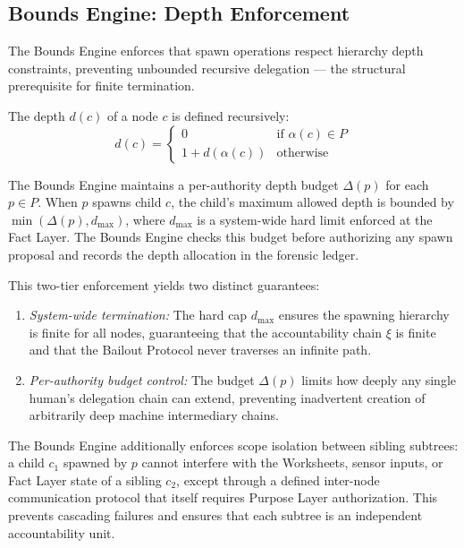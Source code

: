 \subsection{Bounds Engine: Depth Enforcement}
\label{sec:bounds-depth}

The Bounds Engine enforces that spawn operations respect hierarchy depth constraints, preventing unbounded recursive delegation — the structural prerequisite for finite termination.

The depth $d(c)$ of a node $c$ is defined recursively:
\begin{equation}
d(c) = \begin{cases}
0 & \text{if } \alpha(c) \in P \\
1 + d(\alpha(c)) & \text{otherwise}
\end{cases}
\tag{2}
\end{equation}

The Bounds Engine maintains a per-authority depth budget $\Delta(p)$ for each $p \in P$. When $p$ spawns child $c$, the child's maximum allowed depth is bounded by $\min(\Delta(p), d_{\max})$, where $d_{\max}$ is a system-wide hard limit enforced at the Fact Layer. The Bounds Engine checks this budget before authorizing any spawn proposal and records the depth allocation in the forensic ledger.

This two-tier enforcement yields two distinct guarantees:

\begin{enumerate}
    \itemsep0em
    \item \textit{System-wide termination:} The hard cap $d_{\max}$ ensures the spawning hierarchy is finite for all nodes, guaranteeing that the accountability chain $\xi$ is finite and that the Bailout Protocol never traverses an infinite path.
    \item \textit{Per-authority budget control:} The budget $\Delta(p)$ limits how deeply any single human's delegation chain can extend, preventing inadvertent creation of arbitrarily deep machine intermediary chains.
\end{enumerate}

The Bounds Engine additionally enforces scope isolation between sibling subtrees: a child $c_1$ spawned by $p$ cannot interfere with the Worksheets, sensor inputs, or Fact Layer state of a sibling $c_2$, except through a defined inter-node communication protocol that itself requires Purpose Layer authorization. This prevents cascading failures and ensures that each subtree is an independent accountability unit.

